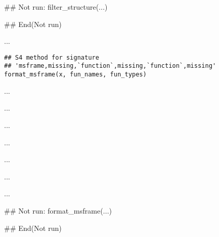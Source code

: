 \documentclass[letterpaper]{book}
\begin{document}
%
\begin{Examples}
\begin{ExampleCode}
## Not run: 
filter_structure(...)

## End(Not run)
\end{ExampleCode}
\end{Examples}
%
\begin{Description}\relax
...
\end{Description}
%
\begin{Usage}
\begin{verbatim}
## S4 method for signature 
## 'msframe,missing,`function`,missing,`function`,missing'
format_msframe(x, fun_names, fun_types)
\end{verbatim}
\end{Usage}
%
\begin{Arguments}
\begin{ldescription}
\item[\code{x}] ...

\item[\code{fun\_names}] ...

\item[\code{fun\_types}] ...

\item[\code{names}] ...

\item[\code{types}] ...

\item[\code{fun\_format}] ...
\end{ldescription}
\end{Arguments}
%
\begin{Details}\relax
...
\end{Details}
%
\begin{Examples}
\begin{ExampleCode}
## Not run: 
format_msframe(...)

## End(Not run)
\end{ExampleCode}
\end{Examples}
\end{document}
